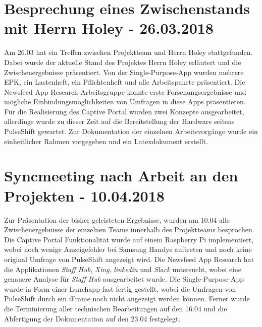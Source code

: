\section{Besprechung eines Zwischenstands mit Herrn Holey - 26.03.2018}
Am 26.03 hat ein Treffen zwischen Projektteam und Herrn Holey stattgefunden. Dabei wurde der aktuelle Stand des Projektes Herrn Holey erläutert und die Zwischenergebnisse präsentiert. Von der Single-Purpose-App wurden mehrere EPK, ein Lastenheft, ein Pflichtenheft und alle Arbeitspakete präsentiert. Die Newsfeed App Research Arbeitsgruppe konnte erste Forschungsergebnisse und mögliche Einbindungsmöglichkeiten von Umfragen in diese Apps präsentieren. Für die Realisierung des Captive Portal wurden zwei Konzepte ausgearbeitet, allerdings wurde zu dieser Zeit auf die Bereitstellung der Hardware seitens PulseShift gewartet. Zur Dokumentation der einzelnen Arbeitsvorgänge wurde ein einheitlicher Rahmen vorgegeben und ein Latexdokument erstellt.

\section{Syncmeeting nach Arbeit an den Projekten - 10.04.2018}
Zur Präsentation der bisher geleisteten Ergebnisse, wurden am 10.04 alle Zwischenergebnisse der einzelnen Teams innerhalb des Projektteams besprochen. Die Captive Portal Funktionalität wurde auf einem Raspberry Pi implementiert, wobei noch wenige Anzeigefehler bei Samsung Handys auftreten und noch keine original Umfrage von PulseShift angezeigt wird. Die Newsfeed App Research hat die Applikationen \textit{Staff Hub}, \textit{Xing}, \textit{linkedin} und \textit{Slack} untersucht, wobei eine genauere Analyse für \textit{Staff Hub} ausgearbeitet wurde. Die Single-Purpose-App wurde in Form einer Lunchapp fast fertig gestellt, wobei die Umfragen von PulseShift durch ein iFrame noch nicht angezeigt werden können. Ferner wurde die Terminierung aller technischen Bearbeitungen auf den 16.04 und die Abfertigung der Dokumentation auf den 23.04 festgelegt.